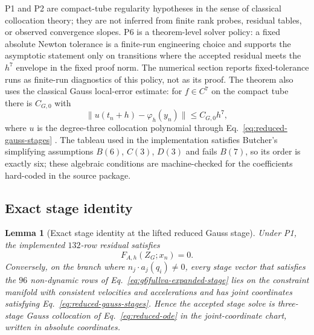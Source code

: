 \documentclass[preprint,12pt]{elsarticle}
\newtheorem{lemma}{Lemma}
\begin{document}
P1 and P2 are compact-tube regularity hypotheses in the sense of classical
collocation theory; they are not inferred from finite rank probes, residual
tables, or observed convergence slopes. P6 is a theorem-level solver policy:
a fixed absolute Newton tolerance is a finite-run engineering choice and
supports the asymptotic statement only on transitions where the accepted
residual meets the $h^7$ envelope in the fixed proof norm. The numerical
section reports fixed-tolerance runs as finite-run diagnostics of this
policy, not as its proof. The theorem also uses the classical Gauss
local-error estimate: for $f\in C^7$ on the compact tube there is $C_{G,0}$
with
\begin{equation}
  \|u(t_n+h)-\varphi_h(y_n)\|\le C_{G,0}h^7,
  \label{eq:gauss-local-truncation}
\end{equation}
where $u$ is the degree-three collocation polynomial through
Eq.~\eqref{eq:reduced-gauss-stages} \cite{hairer1993solving}. The tableau
used in the implementation satisfies Butcher's simplifying assumptions
$B(6)$, $C(3)$, $D(3)$ and fails $B(7)$, so its order is exactly six; these
algebraic conditions are machine-checked for the coefficients hard-coded in
the source package.

\subsection{Exact stage identity}

\begin{lemma}[Exact stage identity at the lifted reduced Gauss stage]
\label{lem:exact-stage-identity}
Under P1, the implemented $132$-row residual satisfies
\begin{equation}
  F_{A,h}(Z_G;x_n)=0 .
  \label{eq:exact-stage-identity}
\end{equation}
Conversely, on the branch where $n_j\cdot a_j(q_i)\neq0$, every stage
vector that satisfies the $96$ non-dynamic rows of
Eq.~\eqref{eq:g6fullva-expanded-stage} lies on the constraint manifold with
consistent velocities and accelerations and has joint coordinates satisfying
Eq.~\eqref{eq:reduced-gauss-stages}. Hence the accepted stage solve is
three-stage Gauss collocation of Eq.~\eqref{eq:reduced-ode} in the
joint-coordinate chart, written in absolute coordinates.
\end{lemma}
\end{document}
